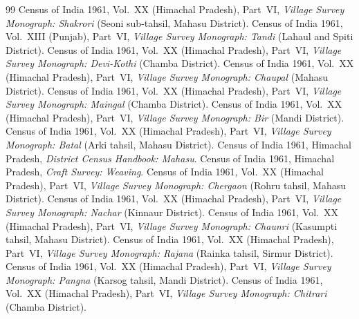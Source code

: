 \begin{thebibliography}{99}
 Census of India 1961, Vol.~XX (Himachal Pradesh), Part~VI, \emph{Village Survey Monograph: Shakrori} (Seoni sub-tahsil, Mahasu District).
 Census of India 1961, Vol.~XIII (Punjab), Part~VI, \emph{Village Survey Monograph: Tandi} (Lahaul and Spiti District).
 Census of India 1961, Vol.~XX (Himachal Pradesh), Part~VI, \emph{Village Survey Monograph: Devi-Kothi} (Chamba District).
 Census of India 1961, Vol.~XX (Himachal Pradesh), Part~VI, \emph{Village Survey Monograph: Chaupal} (Mahasu District).
 Census of India 1961, Vol.~XX (Himachal Pradesh), Part~VI, \emph{Village Survey Monograph: Maingal} (Chamba District).
 Census of India 1961, Vol.~XX (Himachal Pradesh), Part~VI, \emph{Village Survey Monograph: Bir} (Mandi District).
 Census of India 1961, Vol.~XX (Himachal Pradesh), Part~VI, \emph{Village Survey Monograph: Batal} (Arki tahsil, Mahasu District).
 Census of India 1961, Himachal Pradesh, \emph{District Census Handbook: Mahasu}.
 Census of India 1961, Himachal Pradesh, \emph{Craft Survey: Weaving}.
 Census of India 1961, Vol.~XX (Himachal Pradesh), Part~VI, \emph{Village Survey Monograph: Chergaon} (Rohru tahsil, Mahasu District).
 Census of India 1961, Vol.~XX (Himachal Pradesh), Part~VI, \emph{Village Survey Monograph: Nachar} (Kinnaur District).
 Census of India 1961, Vol.~XX (Himachal Pradesh), Part~VI, \emph{Village Survey Monograph: Chaunri} (Kasumpti tahsil, Mahasu District).
 Census of India 1961, Vol.~XX (Himachal Pradesh), Part~VI, \emph{Village Survey Monograph: Rajana} (Rainka tahsil, Sirmur District).
 Census of India 1961, Vol.~XX (Himachal Pradesh), Part~VI, \emph{Village Survey Monograph: Pangna} (Karsog tahsil, Mandi District).
 Census of India 1961, Vol.~XX (Himachal Pradesh), Part~VI, \emph{Village Survey Monograph: Chitrari} (Chamba District).
\end{thebibliography}
